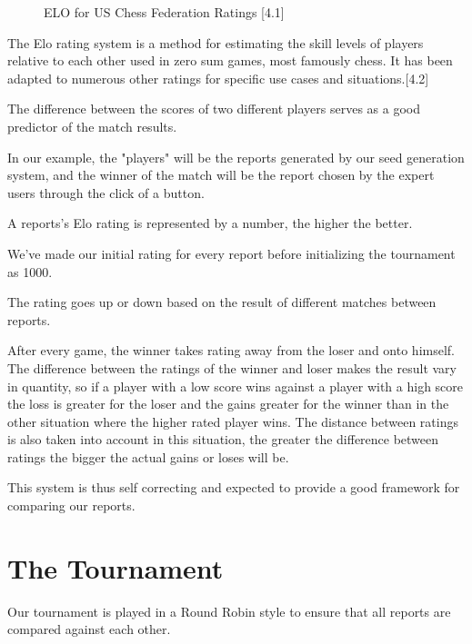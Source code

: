 \begin{figure}[!htb]
    \caption{\label{fig:my-label2} ELO for US Chess Federation Ratings  [4.1]}
\end{figure}

The Elo rating system is a method for estimating the skill levels of players relative to each other used in zero sum games, most famously chess. It has been adapted to numerous other ratings for specific use cases and situations.[4.2]

The difference between the scores of two different players serves as a good predictor of the match results.

In our example, the "players" will be the reports generated by our seed generation system, and the winner of the match will be the report chosen by the expert users through the click of a button.

A reports's Elo rating is represented by a number, the higher the better.

We've made our initial rating for every report before initializing the tournament as 1000.

The rating goes up or down based on the result of different matches between reports. 

After every game, the winner takes rating away from the loser and onto himself.
The difference between the ratings of the winner and loser makes the result vary in quantity, so if a player with a low score wins against a player with a high score the loss is greater for the loser and the gains greater for the winner than in the other situation where the higher rated player wins.
The distance between ratings is also taken into account in this situation, the greater the difference between ratings the bigger the actual gains or loses will be.

This system is thus self correcting and expected to provide a good framework for comparing our reports.

\section{The Tournament}
\label{cap4:sec:tourney}

Our tournament is played in a Round Robin style to ensure that all reports are compared against each other.

